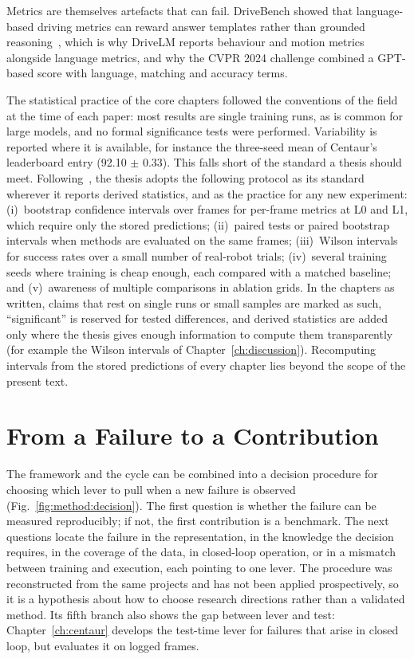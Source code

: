 Metrics are themselves artefacts that can fail. DriveBench showed that language-based driving metrics can reward answer templates rather than grounded reasoning~\cite{xie2025vlms}, which is why DriveLM reports behaviour and motion metrics alongside language metrics, and why the CVPR 2024 challenge combined a GPT-based score with language, matching and accuracy terms.

The statistical practice of the core chapters followed the conventions of the field at the time of each paper: most results are single training runs, as is common for large models, and no formal significance tests were performed. Variability is reported where it is available, for instance the three-seed mean of Centaur's leaderboard entry (92.10 $\pm$ 0.33). This falls short of the standard a thesis should meet. Following~\cite{agarwal2021precipice,kressgazit2024robot}, the thesis adopts the following protocol as its standard wherever it reports derived statistics, and as the practice for any new experiment: (i)~bootstrap confidence intervals over frames for per-frame metrics at L0 and L1, which require only the stored predictions; (ii)~paired tests or paired bootstrap intervals when methods are evaluated on the same frames; (iii)~Wilson intervals for success rates over a small number of real-robot trials; (iv)~several training seeds where training is cheap enough, each compared with a matched baseline; and (v)~awareness of multiple comparisons in ablation grids. In the chapters as written, claims that rest on single runs or small samples are marked as such, ``significant'' is reserved for tested differences, and derived statistics are added only where the thesis gives enough information to compute them transparently (for example the Wilson intervals of Chapter~\ref{ch:discussion}). Recomputing intervals from the stored predictions of every chapter lies beyond the scope of the present text.

\section{From a Failure to a Contribution}\label{sec:method:decision}

The framework and the cycle can be combined into a decision procedure for choosing which lever to pull when a new failure is observed (Fig.~\ref{fig:method:decision}). The first question is whether the failure can be measured reproducibly; if not, the first contribution is a benchmark. The next questions locate the failure in the representation, in the knowledge the decision requires, in the coverage of the data, in closed-loop operation, or in a mismatch between training and execution, each pointing to one lever. The procedure was reconstructed from the same projects and has not been applied prospectively, so it is a hypothesis about how to choose research directions rather than a validated method. Its fifth branch also shows the gap between lever and test: Chapter~\ref{ch:centaur} develops the test-time lever for failures that arise in closed loop, but evaluates it on logged frames.

